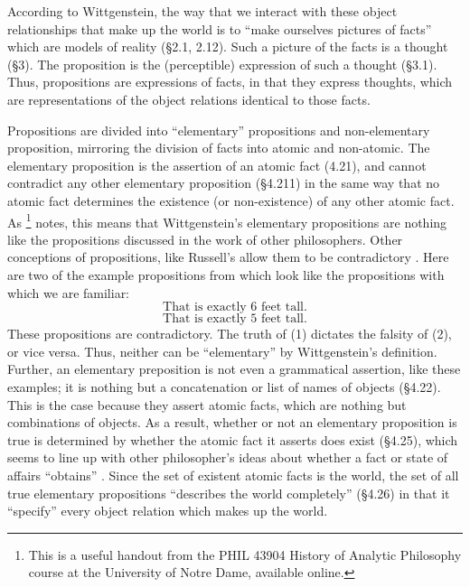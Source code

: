 \documentclass[12pt]{apa}
\begin{document}
According to Wittgenstein, the way that we interact with these object relationships that make up the world is to ``make ourselves pictures of facts'' which are models of reality (\S 2.1, 2.12). Such a picture of the facts is a thought (\S 3). The proposition is the (perceptible) expression of such a thought (\S 3.1). Thus, propositions are expressions of facts, in that they express thoughts, which are representations of the object relations identical to those facts.

Propositions are divided into ``elementary'' propositions and non-elementary proposition, mirroring the division of facts into atomic and non-atomic. The elementary proposition is the assertion of an atomic fact (4.21), and cannot contradict any other elementary proposition (\S 4.211) in the same way that no atomic fact determines the existence (or non-existence) of any other atomic fact. As \footnote{This is a useful handout from the PHIL 43904 History of Analytic Philosophy course at the University of Notre Dame, available online.} notes, this means that Wittgenstein's elementary propositions are nothing like the propositions discussed in the work of other philosophers. Other conceptions of propositions, like Russell's allow them to be contradictory \cite{Klement15}. Here are two of the example propositions from  which look like the propositions with which we are familiar:    
\begin{equation}
\text{That is exactly 6 feet tall.}
\end{equation}
\begin{equation}
\text{That is exactly 5 feet tall.}
\end{equation}
These propositions are contradictory. The truth of (1) dictates the falsity of (2), or vice versa. Thus, neither can be ``elementary'' by Wittgenstein's definition. Further, an elementary preposition is not even a grammatical assertion, like these examples; it is nothing but a concatenation or list of names of objects (\S 4.22). This is the case because they assert atomic facts, which are nothing but combinations of objects. As a result, whether or not an elementary proposition is true is determined by whether the atomic fact it asserts does exist (\S 4.25), which seems to line up with other philosopher's ideas about whether a fact or state of affairs ``obtains'' \cite{Mulligan13}. Since the set of existent atomic facts is the world, the set of all true elementary propositions “describes the world completely” (\S 4.26) in that it ``specify'' every object relation which makes up the world.
\end{document}
